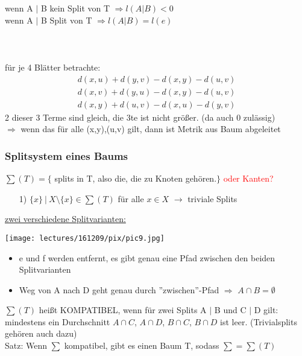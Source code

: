 wenn A $|$ B kein Split von T $\Rightarrow l(A|B) < 0$\\
wenn A $|$ B Split von T $\Rightarrow l(A|B) = l(e)$ 
\\\\
\\\\
für je 4 Blätter betrachte:\\
\begin{align*}
 	d(x,u) + d(y,v) - d(x,y) - d(u,v)\\
 	d(x,v) + d(y,u) - d(x,y) - d(u,v)\\
 	d(x,y) + d(u,v) - d(x,u) - d(y,v)
\end{align*}
2 dieser 3 Terme sind gleich, die 3te ist nicht größer. (da auch 0 zulässig)\\
$\Rightarrow$ wenn das für alle (x,y),(u,v) gilt, dann ist Metrik aus Baum abgeleitet

\newpage
\subsubsection{Splitsystem eines Baums}

$\sum (T) = \{$ splits in T, also die, die zu Knoten gehören.$\}$ \textcolor{red}{oder Kanten?}

\begin{enumerate}
	\item[1)] $ \{ x \}~|~X \setminus \{ x \} \in \sum (T)$ für alle $x \in X$ $\rightarrow$ triviale Splits
\end{enumerate}

\underline{zwei verschiedene Splitvarianten:}
\begin{center}
	\texttt{[image: lectures/161209/pix/pic9.jpg]}
\end{center}
\begin{itemize}
	\item e und f werden entfernt, es gibt genau eine Pfad zwischen den beiden Splitvarianten
	\item Weg von A nach D geht genau durch ''zwischen''-Pfad $\Rightarrow$ $A \cap B = \emptyset$
\end{itemize}

$\sum (T)$ heißt KOMPATIBEL, wenn für zwei Splits A $|$ B und C $|$ D gilt:\\
mindestens ein Durchschnitt $A \cap C$, $A \cap D$, $B \cap C$, $B \cap D$ ist leer. (Trivialsplits gehören auch dazu)\\

Satz: Wenn $\sum$ kompatibel, gibt es einen Baum T, sodass $\sum = \sum(T)$
